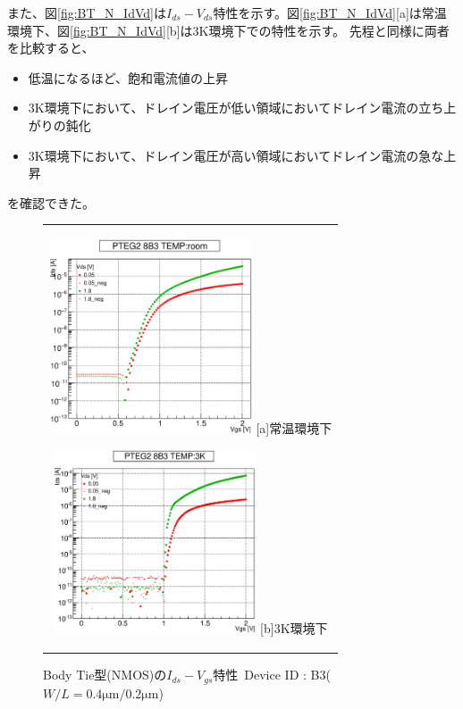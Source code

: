 			また、図\ref{fig:BT_N_IdVd}は$I_{ds}-V_{ds}$特性を示す。図\ref{fig:BT_N_IdVd}[a]は常温環境下、図\ref{fig:BT_N_IdVd}[b]は3K環境下での特性を示す。
			先程と同様に両者を比較すると、
			\begin{itemize}
				\item 低温になるほど、飽和電流値の上昇
				\item 3K環境下において、ドレイン電圧が低い領域においてドレイン電流の立ち上がりの鈍化
				\item 3K環境下において、ドレイン電圧が高い領域においてドレイン電流の急な上昇
			\end{itemize}
			を確認できた。

			\begin{figure}[htbp]
				\begin{center}
					\begin{tabular}{c}
						\begin{minipage}{0.5\hsize}
							\begin{center}
								\includegraphics[clip, width=6cm]{./Chapter/Appendix/Picture/NBT/B3/PTEG2_8_B3_IdVg_room.eps}
								\hspace{1.6cm} [a]常温環境下
							\end{center}
						\end{minipage}
						\begin{minipage}{0.5\hsize}
							\begin{center}
								\includegraphics[clip, width=6cm]{./Chapter/Appendix/Picture/NBT/B3/PTEG2_8_B3_IdVg_3K.eps}
								\hspace{1.6cm} [b]3K環境下
							\end{center}
						\end{minipage}
					\end{tabular}
					\caption{Body Tie型(NMOS)の$I_{ds}-V_{gs}$特性\ Device ID : B3($W/L = 0.4\mathrm{\mu m} / 0.2\mathrm{\mu m}$)}
					\label{fig:BT_N_IdVg}
				\end{center}
			\end{figure}
